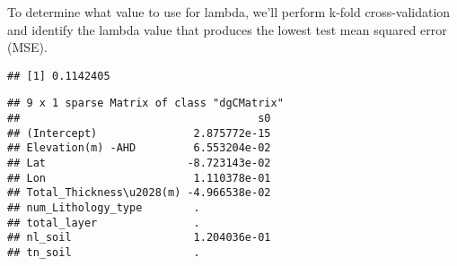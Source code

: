 \documentclass[
]{article}
\newenvironment{Shaded}{\begin{snugshade}}{\end{snugshade}}
\newcommand{\AttributeTok}[1]{\textcolor[rgb]{0.77,0.63,0.00}{#1}}
\newcommand{\CommentTok}[1]{\textcolor[rgb]{0.56,0.35,0.01}{\textit{#1}}}
\newcommand{\DecValTok}[1]{\textcolor[rgb]{0.00,0.00,0.81}{#1}}
\newcommand{\FunctionTok}[1]{\textcolor[rgb]{0.00,0.00,0.00}{#1}}
\newcommand{\NormalTok}[1]{#1}
\newcommand{\OtherTok}[1]{\textcolor[rgb]{0.56,0.35,0.01}{#1}}
\newcommand{\SpecialCharTok}[1]{\textcolor[rgb]{0.00,0.00,0.00}{#1}}
\newcommand{\StringTok}[1]{\textcolor[rgb]{0.31,0.60,0.02}{#1}}
\begin{document}
To determine what value to use for lambda, we'll perform k-fold
cross-validation and identify the lambda value that produces the lowest
test mean squared error (MSE).

\begin{Shaded}
\end{Shaded}

\begin{verbatim}
## [1] 0.1142405
\end{verbatim}

\begin{Shaded}
\end{Shaded}

\begin{verbatim}
## 9 x 1 sparse Matrix of class "dgCMatrix"
##                                     s0
## (Intercept)               2.875772e-15
## Elevation(m) -AHD         6.553204e-02
## Lat                      -8.723143e-02
## Lon                       1.110378e-01
## Total_Thickness\u2028(m) -4.966538e-02
## num_Lithology_type        .           
## total_layer               .           
## nl_soil                   1.204036e-01
## tn_soil                   .
\end{verbatim}
\end{document}
